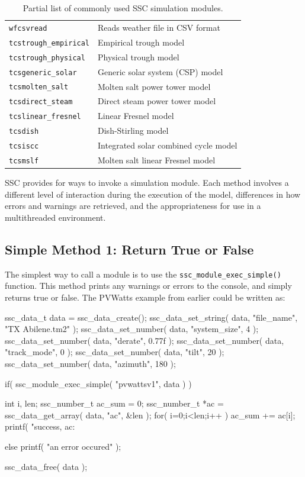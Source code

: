 \documentclass{scrartcl} %
\newcommand{\+}{\discretionary{\mbox{\scriptsize$\hookleftarrow$}}{}{}}
\begin{document}
\begin{table}
\begin{center}
\begin{tabular}{ll}
\texttt{wfcsvread} & Reads weather file in CSV format\\
\texttt{tcstrough\_empirical} & Empirical trough model\\
\texttt{tcstrough\_physical} & Physical trough model\\
\texttt{tcsgeneric\_solar} & Generic solar system (CSP) model\\
\texttt{tcsmolten\_salt} & Molten salt power tower model\\
\texttt{tcsdirect\_steam} & Direct steam power tower model\\
\texttt{tcslinear\_fresnel} & Linear Fresnel model\\
\texttt{tcsdish} & Dish-Stirling model\\
\texttt{tcsiscc} & Integrated solar combined cycle model\\
\texttt{tcsmslf} & Molten salt linear Fresnel model\\
\end{tabular}
\label{tab_modules}
\caption{Partial list of commonly used SSC simulation modules.}
\end{center}
\end{table}

SSC provides for ways to invoke a simulation module.  Each method involves a different level of interaction during the execution of the model, differences in how errors and warnings are retrieved, and the appropriateness for use in a multithreaded environment.

\subsection{Simple Method 1: Return True or False}

The simplest way to call a module is to use the \texttt{ssc\_module\_exec\_simple()} function.  This method prints any warnings or errors to the console, and simply returns true or false. The PVWatts example from earlier could be written as:

\begin{verbatimtab}[4]
ssc_data_t data = ssc_data_create();
ssc_data_set_string( data, "file_name", "TX Abilene.tm2" );
ssc_data_set_number( data, "system_size", 4 );
ssc_data_set_number( data, "derate", 0.77f );
ssc_data_set_number( data, "track_mode", 0 );
ssc_data_set_number( data, "tilt", 20 );
ssc_data_set_number( data, "azimuth", 180 );

if( ssc_module_exec_simple( "pvwattsv1", data ) )
{
	int i, len;
	ssc_number_t ac_sum = 0;
	ssc_number_t *ac = ssc_data_get_array( data, "ac", &len );
	for( i=0;i<len;i++ ) ac_sum += ac[i];
	printf( "success, ac: %

}
else
	printf( "an error occured\n" );

ssc_data_free( data );
\end{verbatimtab}
\end{document}
